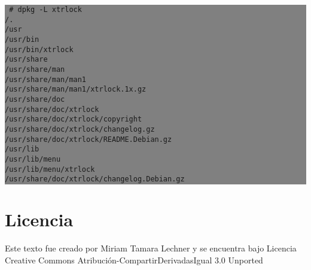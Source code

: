 \documentclass[12pt]{article}
\begin{document}
\colorbox{grey}{\parbox[t]{0.95\linewidth}{ \vspace*{0.5cm} {\tt
\# dpkg -L xtrlock \\
/. \\
/usr \\
/usr/bin \\
/usr/bin/xtrlock \\
/usr/share \\
/usr/share/man \\
/usr/share/man/man1 \\
/usr/share/man/man1/xtrlock.1x.gz \\
/usr/share/doc \\
/usr/share/doc/xtrlock \\
/usr/share/doc/xtrlock/copyright \\
/usr/share/doc/xtrlock/changelog.gz \\
/usr/share/doc/xtrlock/README.Debian.gz \\
/usr/lib \\
/usr/lib/menu \\
/usr/lib/menu/xtrlock \\
/usr/share/doc/xtrlock/changelog.Debian.gz \\
 } \vspace*{0.5cm} } } 



\section*{Licencia}

Este texto fue creado por Miriam Tamara Lechner y se encuentra bajo 
Licencia Creative Commons Atribución-CompartirDerivadasIgual 3.0 Unported
\end{document}
